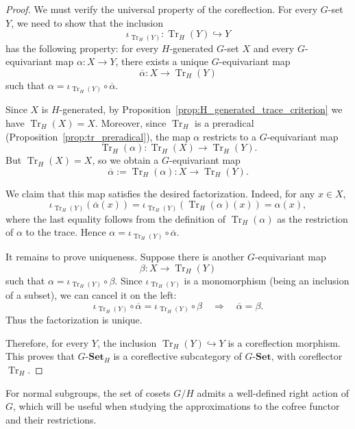 \documentclass{amsart}
\begin{document}
\begin{proof}
We must verify the universal property of the coreflection. For every $G$-set $Y$, we need to show that the inclusion
\[
\iota_{\operatorname{Tr}_H(Y)} \colon \operatorname{Tr}_H(Y) \hookrightarrow Y
\]
has the following property: for every $H$-generated $G$-set $X$ and every $G$-equivariant map $\alpha \colon X \longrightarrow Y$, there exists a unique $G$-equivariant map
\[
\overline{\alpha} \colon X \longrightarrow \operatorname{Tr}_H(Y)
\]
such that $\alpha = \iota_{\operatorname{Tr}_H(Y)} \circ \overline{\alpha}$.

Since $X$ is $H$-generated, by Proposition~\ref{prop:H_generated_trace_criterion} we have $\operatorname{Tr}_H(X) = X$. Moreover, since $\operatorname{Tr}_H$ is a preradical (Proposition~\ref{prop:tr_preradical}), the map $\alpha$ restricts to a $G$-equivariant map
\[
\operatorname{Tr}_H(\alpha) \colon \operatorname{Tr}_H(X) \longrightarrow \operatorname{Tr}_H(Y).
\]
But $\operatorname{Tr}_H(X) = X$, so we obtain a $G$-equivariant map
\[
\overline{\alpha} := \operatorname{Tr}_H(\alpha) \colon X \longrightarrow \operatorname{Tr}_H(Y).
\]

We claim that this map satisfies the desired factorization. Indeed, for any $x \in X$,
\[
\iota_{\operatorname{Tr}_H(Y)}(\overline{\alpha}(x))
= \iota_{\operatorname{Tr}_H(Y)}(\operatorname{Tr}_H(\alpha)(x))
= \alpha(x),
\]
where the last equality follows from the definition of $\operatorname{Tr}_H(\alpha)$ as the restriction of $\alpha$ to the trace. Hence $\alpha = \iota_{\operatorname{Tr}_H(Y)} \circ \overline{\alpha}$.

It remains to prove uniqueness. Suppose there is another $G$-equivariant map
\[
\beta \colon X \longrightarrow \operatorname{Tr}_H(Y)
\]
such that $\alpha = \iota_{\operatorname{Tr}_H(Y)} \circ \beta$. Since $\iota_{\operatorname{Tr}_H(Y)}$ is a monomorphism (being an inclusion of a subset), we can cancel it on the left:
\[
\iota_{\operatorname{Tr}_H(Y)} \circ \overline{\alpha}
= \iota_{\operatorname{Tr}_H(Y)} \circ \beta
\quad \Longrightarrow \quad
\overline{\alpha} = \beta.
\]
Thus the factorization is unique.

Therefore, for every $Y$, the inclusion $\operatorname{Tr}_H(Y) \hookrightarrow Y$ is a coreflection morphism. This proves that $G\text{-}\mathbf{Set}_H$ is a coreflective subcategory of $G\text{-}\mathbf{Set}$, with coreflector $\operatorname{Tr}_H$.
\end{proof}

For normal subgroups, the set of cosets $G/H$ admits a well-defined right action of $G$, which will be useful when studying the approximations to the cofree functor and their restrictions.
\end{document}
